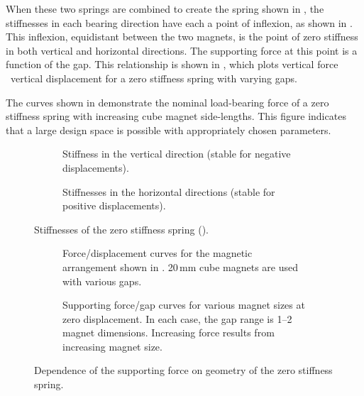When these two springs are combined to create the spring shown in
, the stiffnesses in each bearing direction
have each a point of inflexion, as shown in . This
inflexion, equidistant between the two magnets, is the point of zero
stiffness in both vertical and horizontal directions. The supporting
force at this point is a function of the gap. This relationship is
shown in , which plots vertical force
\vs\  vertical displacement for a zero stiffness spring with varying
gaps.

The curves shown in  demonstrate the
nominal load-bearing force of a zero stiffness spring with
increasing cube magnet side-lengths. This figure indicates that a
large design space is possible with appropriately chosen parameters.

\begin{figure}[p]
  \begin{subfigure}
    \caption{Stiffness in the vertical direction 
     (stable for negative displacements).}
   \end{subfigure}
  \hfill
  \begin{subfigure}
    \caption{Stiffnesses in the horizontal directions 
     (stable for positive displacements).}
  \end{subfigure}
  \caption{Stiffnesses of the zero stiffness spring ().}
\end{figure}

\begin{figure}
  \begin{subfigure}
    \caption{Force/displacement curves for the magnetic arrangement shown
        in . 20\,mm cube magnets
        are used with various gaps.
        }  
  \end{subfigure}
  \par
  \begin{subfigure}
    \caption{Supporting force/gap curves for various magnet sizes
     at zero displacement. In each case, the gap range is 1--2 magnet dimensions.
     Increasing force results from increasing magnet size.
     }   
  \end{subfigure}
     \caption{Dependence of the supporting force on geometry of the
       zero stiffness spring.}
\end{figure}

